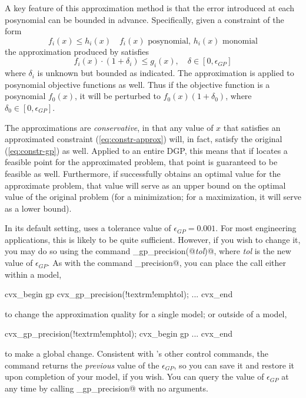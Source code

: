 \documentclass[12pt]{article}
\begin{document}
A key feature of this approximation method is that the error introduced at
each posynomial can be bounded in advance. Specifically,
given a constraint of the form
\begin{equation}
	\label{eq:constr-gp}
	f_i(x) \leq h_i(x) \quad f_i(x)\text{ posynomial, }h_i(x)\text{ monomial}
\end{equation}
the approximation produced by \cvx satisfies
\begin{equation}
	\label{eq:constr-approx}
	f_i(x) \cdot ( 1 + \delta_i ) \leq g_i(x), \quad \delta\in[0,\epsilon_{GP}]
\end{equation}
where $\delta_i$ is unknown but bounded as indicated.
The approximation is applied to posynomial objective functions as well. Thus
if the objective function is a posynomial $f_0(x)$, it will be perturbed to
$f_0(x)(1+\delta_0)$, where $\delta_0\in[0,\epsilon_{GP}]$. 

The approximations are \emph{conservative}, in that any value of $x$ that
satisfies an approximated constraint (\ref{eq:constr-approx})
will, in fact, satisfy the original (\ref{eq:constr-gp}) as well.
Applied to an entire DGP, this means that if \cvx locates a feasible point for
the approximated problem, that point is guaranteed to be feasible as well.
Furthermore, if \cvx successfully obtains an optimal value for the approximate
problem, that value will serve as an upper bound on the optimal value of
the original problem (for a minimization; for a maximization, it will serve
as a lower bound). 

In its default setting, \cvx uses a tolerance value of $\epsilon_{GP}=0.001$.
For most engineering applications, this is likely to be quite sufficient. However,
if you wish to change it, you may do so using the command
\verb@cvx_gp_precision(@\emph{tol}\verb@)@,
where \emph{tol} is the new value of $\epsilon_{GP}$. As with the command
\verb@cvx_precision@, you can place the call either within a model,
\begin{code}[commandchars=\!\{\}]
	cvx_begin gp
	    cvx_gp_precision(!textrm{!emph{tol}});
	    ...
	cvx_end
\end{code}
to change the approximation quality for a single model; or outside of a model,
\begin{code}[commandchars=\!\{\}]
	cvx_gp_precision(!textrm{!emph{tol}});
	cvx_begin gp
	    ...
	cvx_end
\end{code}
to make a global change. Consistent with
\cvx's other control commands, the command returns the \emph{previous}
value of the $\epsilon_{GP}$, so you can save it and restore it upon completion
of your model, if you wish. You can query the value of $\epsilon_{GP}$ at any
time by calling \verb@cvx_gp_precision@ with no arguments. 
\end{document}
